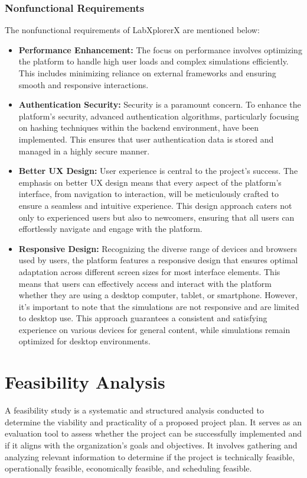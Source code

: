 \subsubsection{Nonfunctional Requirements}
The nonfunctional requirements of LabXplorerX are mentioned below:
\begin{itemize}
    \item \textbf{Performance Enhancement:} The focus on performance involves optimizing the platform to handle high user loads and complex simulations efficiently. This includes minimizing reliance on external frameworks and ensuring smooth and responsive interactions.
    \item \textbf{Authentication Security:} Security is a paramount concern. To enhance the platform’s security, advanced authentication algorithms, particularly focusing on hashing techniques within the backend environment, have been implemented. This ensures that user authentication data is stored and managed in a highly secure manner.
    \item \textbf{Better UX Design:} User experience is central to the project’s success. The emphasis on better UX design means that every aspect of the platform’s interface, from navigation to interaction, will be meticulously crafted to ensure a seamless and intuitive experience. This design approach caters not only to experienced users but also to newcomers, ensuring that all users can effortlessly navigate and engage with the platform.
    \item \textbf{Responsive Design:}  
    Recognizing the diverse range of devices and browsers used by users, the platform features a responsive design that ensures optimal adaptation across different screen sizes for most interface elements. This means that users can effectively access and interact with the platform whether they are using a desktop computer, tablet, or smartphone. However, it's important to note that the simulations are not responsive and are limited to desktop use. This approach guarantees a consistent and satisfying experience on various devices for general content, while simulations remain optimized for desktop environments.

\end{itemize}
\section{Feasibility Analysis}
A feasibility study is a systematic and structured analysis conducted to determine the viability and practicality of a proposed project plan. It serves as an evaluation tool to assess whether the project can be successfully implemented and if it aligns with the organization's goals and objectives. It involves gathering and analyzing relevant information to determine if the project is technically feasible, operationally feasible, economically feasible, and scheduling feasible.
